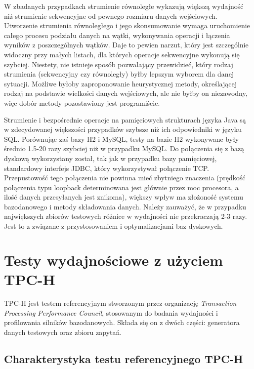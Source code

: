 \documentclass[12pt,twoside,openright]{extarticle}
\begin{document}
    W zbadanych przypadkach strumienie równoległe wykazują większą wydajność niż strumienie sekwencyjne od pewnego rozmiaru danych wejściowych. Utworzenie strumienia równoległego i jego skonsumowanie wymaga uruchomienie całego procesu podziału danych na wątki, wykonywania operacji i łączenia wyników z poszczególnych wątków. Daje to pewien narzut, który jest szczególnie widoczny przy małych listach, dla których operacje sekwencyjne wykonują się szybciej. Niestety, nie istnieje sposób pozwalający przewidzieć, który rodzaj strumienia (sekwencyjny czy równoległy) byłby lepszym wyborem dla danej sytuacji. Możliwe byłoby zaproponowanie heurystycznej metody, określającej rodzaj na podstawie wielkości danych wejściowych, ale nie byłby on niezawodny, więc dobór metody pozostawiony jest programiście.

    Strumienie i bezpośrednie operacje na pamięciowych strukturach języka Java są w zdecydowanej większości przypadków szybsze niż ich odpowiedniki w języku SQL. Porównując zaś bazy H2 i MySQL, testy na bazie H2 wykonywane były średnio 1.5-20 razy szybciej niż w przypadku MySQL.  Do połączenia się z bazą dyskową wykorzystany został, tak jak w przypadku bazy pamięciowej, standardowy interfejs JDBC, który wykorzystywał połączenie TCP. Przepustowość tego połączenia nie powinna mieć zbytniego znaczenia (prędkość połączenia typu loopback determinowana jest głównie przez moc procesora, a ilość danych przesyłanych jest znikoma), większy wpływ ma złożoność systemu bazodanowego i metody składowania danych. Należy zauważyć, że w przypadku największych zbiorów testowych różnice w wydajności nie przekraczają 2-3 razy. Jest to z związane z przystosowaniem i optymalizacjami baz dyskowych.


\section{Testy wydajnościowe z użyciem TPC-H} \label{tpc}

    TPC-H jest testem referencyjnym stworzonym przez organizację \textit{Transaction Processing Performance Council}, stosowanym do badania wydajności i profilowania silników bazodanowych. Składa się on z dwóch części: generatora danych testowych oraz zbioru zapytań.

\subsection{Charakterystyka testu referencyjnego TPC-H}
\end{document}
